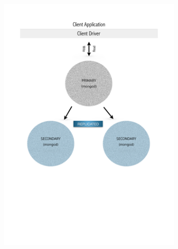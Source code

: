 
\begin{figure}[H]
   \begin{subfigure}[t]{0.49\textwidth}\vspace{0pt}
   \centering
    	\includegraphics[trim = 0mm 90mm 0mm 20mm, clip, width=1.0\textwidth]{resources/replicaSet/replicaSetStrongConsistency}

\end{subfigure}
\end{figure}
